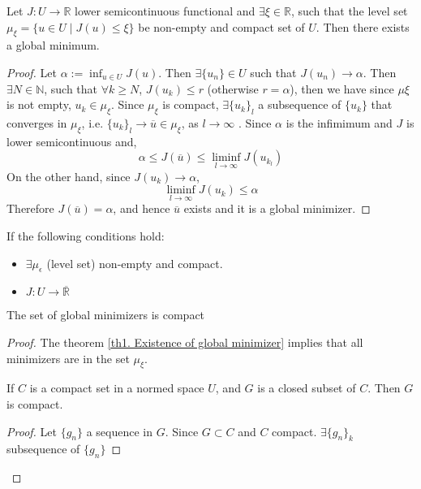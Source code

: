 \begin{theorem}
	Let $J: U\rightarrow \mathbb{R}$ lower semicontinuous functional and $\exists \xi \in \mathbb{R}$, such that the level set $\mu_\xi=\{ u \in U \mid J(u)\leq \xi\}$ be non-empty and compact set of $U$. Then there exists a global minimum.
	\begin{proof}
		Let $\alpha := \inf_{u\in U} J(u)$. Then $\exists \{u_n\} \in U $ such that $J(u_n) \rightarrow \alpha$. Then  $\exists N\in \mathbb{N}$, such that $\forall k \geq N$,  $J(u_k) \leq r$ (otherwise $r=\alpha$), then we have since $\mu \xi$ is not empty, $u_k \in \mu_\xi$. Since $\mu_\xi$ is compact,  $\exists \{u_k\}_l$ a subsequence of $\{u_k\}$ that converges in $\mu_\xi$, i.e. $\{u_k\}_l \rightarrow \overline{u} \in \mu_\xi$, as $l \rightarrow \infty$	. Since $\alpha$ is the infimimum and $J$ is lower semicontinuous and,
		 \[\alpha \leq J(\overline{u}) \leq \liminf_{l\rightarrow \infty} J(u_{k_l}) \]
		 On the other hand,  since $J(u_k) \rightarrow \alpha$,
		 \[
		  \liminf_{l\rightarrow \infty} J(u_k) \leq \alpha
		 \]
		 Therefore $J(\overline{u})=\alpha$, and hence $\overline{u}$ exists and it is a global minimizer.
	\end{proof}
	\label{th1. Existence of global minimizer}
\end{theorem}
\begin{corollary}
	If the following conditions hold:
	\begin{itemize}
		\item $\exists \mu_\epsilon$ (level set) non-empty and compact.
		\item $J: U \rightarrow \overline{\mathbb{R}}$
	\end{itemize}
	The set of global minimizers is compact
	\begin{proof}
		The theorem \ref{th1. Existence of global minimizer} implies that all minimizers are in the set $\mu_\xi$.
		
		\begin{remark}
			If $C$ is a compact set in a normed space $U$, and $G$ is a closed subset of $C$. Then $G$ is compact.
			\begin{proof}
				Let $\{ g_n\}$ a sequence in $G$. Since $G \subset C$ and $C$ compact. $\exists \{g_n\}_k$ subsequence of $\{g_n\}$
			\end{proof}
		\end{remark}
		\begin{remark}
		\end{remark}
	\end{proof}
\end{corollary}

